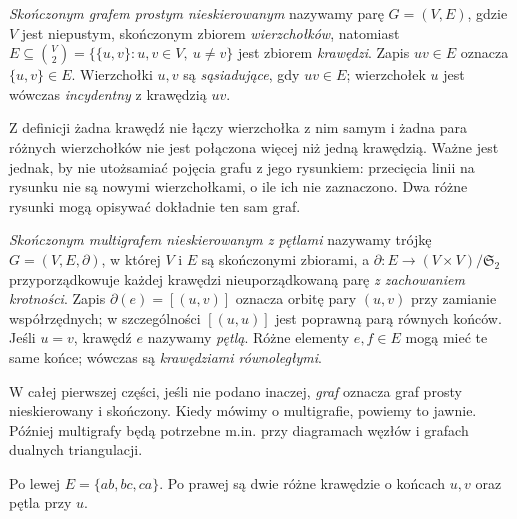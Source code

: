 \begin{definicja}
\emph{Skończonym grafem prostym nieskierowanym} nazywamy parę
$G=(V,E)$, gdzie $V$ jest niepustym, skończonym zbiorem
\emph{wierzchołków}, natomiast
$E\subseteq\binom V2=\{\{u,v\}:u,v\in V,\ u\ne v\}$
jest zbiorem \emph{krawędzi}. Zapis $uv\in E$ oznacza
$\{u,v\}\in E$. Wierzchołki $u,v$ są \emph{sąsiadujące},
gdy $uv\in E$; wierzchołek $u$ jest wówczas \emph{incydentny}
z krawędzią $uv$.
\end{definicja}

Z definicji żadna krawędź nie łączy wierzchołka z nim samym i żadna para
różnych wierzchołków nie jest połączona więcej niż jedną krawędzią.
Ważne jest jednak, by nie utożsamiać pojęcia grafu z jego rysunkiem:
przecięcia linii na rysunku nie są nowymi wierzchołkami, o ile ich
nie zaznaczono. Dwa różne rysunki mogą opisywać dokładnie ten sam graf.

\begin{definicja}
\emph{Skończonym multigrafem nieskierowanym z pętlami}
nazywamy trójkę $G=(V,E,\partial)$, w której $V$ i $E$ są
skończonymi zbiorami, a $\partial:E\to (V\times V)/\mathfrak S_2$
przyporządkowuje każdej krawędzi nieuporządkowaną parę
\emph{z zachowaniem krotności}. Zapis $\partial(e)=[(u,v)]$
oznacza orbitę pary $(u,v)$ przy zamianie współrzędnych;
w szczególności $[(u,u)]$ jest poprawną parą równych końców.
Jeśli $u=v$, krawędź $e$ nazywamy \emph{pętlą}.
Różne elementy $e,f\in E$ mogą mieć te same końce;
wówczas są \emph{krawędziami równoległymi}.
\end{definicja}

W całej pierwszej części, jeśli nie podano inaczej, \emph{graf} oznacza
graf prosty nieskierowany i skończony. Kiedy mówimy o multigrafie,
powiemy to jawnie. Później multigrafy będą potrzebne m.in.
przy diagramach węzłów i grafach dualnych triangulacji.

\begin{center}

{\footnotesize Po lewej $E=\{ab,bc,ca\}$. Po prawej są dwie różne
krawędzie o końcach $u,v$ oraz pętla przy $u$.}
\end{center}

